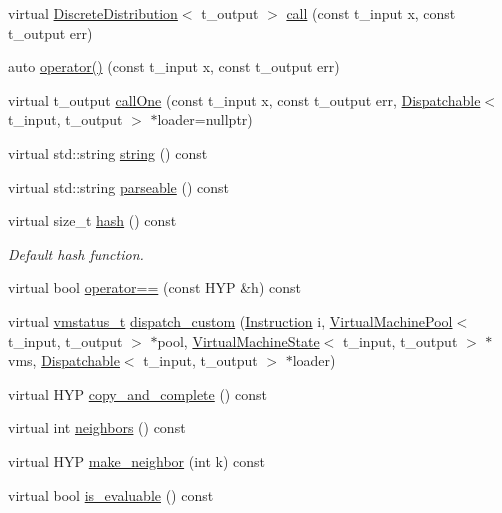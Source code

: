 \begin{DoxyCompactItemize}
\item 
virtual \hyperlink{class_discrete_distribution}{Discrete\+Distribution}$<$ t\+\_\+output $>$ \hyperlink{class_l_o_t_hypothesis_a48858f5add54c1886d946e641b08062a}{call} (const t\+\_\+input x, const t\+\_\+output err)
\item 
auto \hyperlink{class_l_o_t_hypothesis_ae64a27eeb271316fd76cf26a86fff7e6}{operator()} (const t\+\_\+input x, const t\+\_\+output err)
\item 
virtual t\+\_\+output \hyperlink{class_l_o_t_hypothesis_ad792b258bdb4b0828f11ac721f52e704}{call\+One} (const t\+\_\+input x, const t\+\_\+output err, \hyperlink{class_dispatchable}{Dispatchable}$<$ t\+\_\+input, t\+\_\+output $>$ $\ast$loader=nullptr)
\item 
virtual std\+::string \hyperlink{class_l_o_t_hypothesis_a0a82849305c4718f4406f7a8c13fbfa7}{string} () const
\item 
virtual std\+::string \hyperlink{class_l_o_t_hypothesis_a1584633d01abe30a6f69d0664c1e137a}{parseable} () const
\item 
virtual size\+\_\+t \hyperlink{class_l_o_t_hypothesis_a8d269f6db62028468142df68ee225ea3}{hash} () const
\begin{DoxyCompactList}\small\item\em Default hash function. \end{DoxyCompactList}\item 
virtual bool \hyperlink{class_l_o_t_hypothesis_a26da0f250197d375b4ae2400815c3288}{operator==} (const H\+YP \&h) const
\item 
virtual \hyperlink{_instruction_8h_a6202215407ab29590bb936ca2996cf64}{vmstatus\+\_\+t} \hyperlink{class_l_o_t_hypothesis_a6eae1ce4486971909e0245ab9e30ddeb}{dispatch\+\_\+custom} (\hyperlink{class_instruction}{Instruction} i, \hyperlink{class_virtual_machine_pool}{Virtual\+Machine\+Pool}$<$ t\+\_\+input, t\+\_\+output $>$ $\ast$pool, \hyperlink{class_virtual_machine_state}{Virtual\+Machine\+State}$<$ t\+\_\+input, t\+\_\+output $>$ $\ast$vms, \hyperlink{class_dispatchable}{Dispatchable}$<$ t\+\_\+input, t\+\_\+output $>$ $\ast$loader)
\item 
virtual H\+YP \hyperlink{class_l_o_t_hypothesis_af0274e15c0e19e8f42324b7099e2b4a1}{copy\+\_\+and\+\_\+complete} () const
\item 
virtual int \hyperlink{class_l_o_t_hypothesis_a9716b492f5d05d6f008264bca4a4445f}{neighbors} () const
\item 
virtual H\+YP \hyperlink{class_l_o_t_hypothesis_a3460b6ff86b9b964f65c2298bf52b2af}{make\+\_\+neighbor} (int k) const
\item 
virtual bool \hyperlink{class_l_o_t_hypothesis_ad43c57ed606c0f5af6cce0752725f583}{is\+\_\+evaluable} () const
\end{DoxyCompactItemize}
